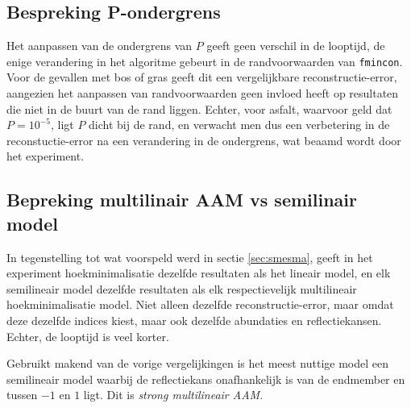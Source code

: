 \documentclass[12pt]{report}
\begin{document}
\subsection{Bespreking P-ondergrens}

Het aanpassen van de ondergrens van $P$ geeft geen verschil in de looptijd, de enige verandering in het algoritme gebeurt in de randvoorwaarden van \texttt{fmincon}. Voor de gevallen met bos of gras geeft dit een vergelijkbare reconstructie-error, aangezien het aanpassen van randvoorwaarden geen invloed heeft op resultaten die niet in de buurt van de rand liggen. Echter, voor asfalt, waarvoor geld dat $P=10^{-5}$, ligt $P$ dicht bij de rand, en verwacht men dus een verbetering in de reconstuctie-error na een verandering in de ondergrens, wat beaamd wordt door het experiment.

\subsection{Bepreking multilinair AAM vs semilinair model}

In tegenstelling tot wat voorspeld werd in sectie \ref{sec:smesma}, geeft in het experiment hoekminimalisatie dezelfde resultaten als het lineair model, en elk semilineair model dezelfde resultaten als elk respectievelijk multilineair hoekminimalisatie model. Niet alleen dezelfde reconstructie-error, maar omdat deze dezelfde indices kiest, maar ook dezelfde abundaties en reflectiekansen. Echter, de looptijd is veel korter. 

\vspace{5 mm}

Gebruikt makend van de vorige vergelijkingen is het meest nuttige model een semilineair model waarbij de reflectiekans onafhankelijk is van de endmember en tussen $-1$ en $1$ ligt. Dit is \textit{strong multilineair AAM}.


\begin{flushleft}
\nocite{*}
{}


\end{flushleft}
\end{document}
